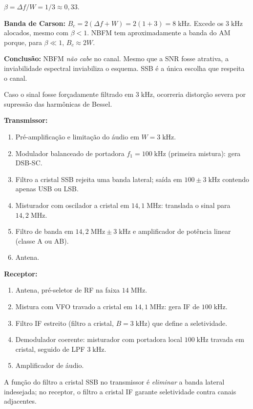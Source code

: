 \documentclass[11pt,a4paper]{article}
\begin{document}
\begin{resolucao}

$\beta = \Delta f/W = 1/3 \approx 0{,}33$.

\textbf{Banda de Carson:} $B_c = 2(\Delta f + W) = 2(1 + 3) = 8\;\text{kHz}$. Excede os $3\;\text{kHz}$ alocados, mesmo com $\beta < 1$. NBFM tem aproximadamente a banda do AM porque, para $\beta \ll 1$, $B_c \approx 2W$.

\textbf{Conclusão:} NBFM \emph{não cabe} no canal. Mesmo que a SNR fosse atrativa, a inviabilidade espectral inviabiliza o esquema. SSB é a única escolha que respeita o canal.

Caso o sinal fosse forçadamente filtrado em $3\;\text{kHz}$, ocorreria distorção severa por supressão das harmônicas de Bessel.
\end{resolucao}

\begin{resolucao}

\textbf{Transmissor:}
\begin{enumerate}\itemsep0pt
  \item Pré-amplificação e limitação do áudio em $W = 3\;\text{kHz}$.
  \item Modulador balanceado de portadora $f_1 = 100\;\text{kHz}$ (primeira mistura): gera DSB-SC.
  \item Filtro a cristal SSB rejeita uma banda lateral; saída em $100 \pm 3\;\text{kHz}$ contendo apenas USB ou LSB.
  \item Misturador com oscilador a cristal em $14{,}1\;\text{MHz}$: translada o sinal para $14{,}2\;\text{MHz}$.
  \item Filtro de banda em $14{,}2\;\text{MHz} \pm 3\;\text{kHz}$ e amplificador de potência linear (classe A ou AB).
  \item Antena.
\end{enumerate}

\textbf{Receptor:}
\begin{enumerate}\itemsep0pt
  \item Antena, pré-seletor de RF na faixa $14\;\text{MHz}$.
  \item Mistura com VFO travado a cristal em $14{,}1\;\text{MHz}$: gera IF de $100\;\text{kHz}$.
  \item Filtro IF estreito (filtro a cristal, $B = 3\;\text{kHz}$) que define a seletividade.
  \item Demodulador coerente: misturador com portadora local $100\;\text{kHz}$ travada em cristal, seguido de LPF $3\;\text{kHz}$.
  \item Amplificador de áudio.
\end{enumerate}

A função do filtro a cristal SSB no transmissor é \emph{eliminar} a banda lateral indesejada; no receptor, o filtro a cristal IF garante seletividade contra canais adjacentes.
\end{resolucao}
\end{document}
